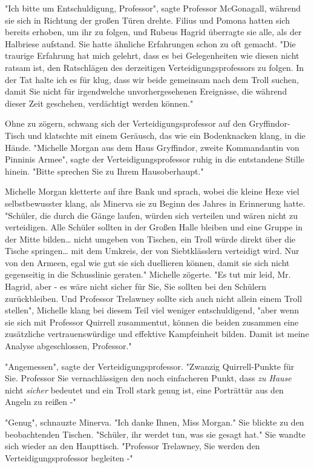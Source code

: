 {"Ich bitte um Entschuldigung, Professor", sagte Professor McGonagall, während sie sich in Richtung der großen Türen drehte. Filius und Pomona hatten sich bereits erhoben, um ihr zu folgen, und Rubeus Hagrid überragte sie alle, als der Halbriese aufstand. Sie hatte ähnliche Erfahrungen schon zu oft gemacht. "Die traurige Erfahrung hat mich gelehrt, dass es bei Gelegenheiten wie diesen nicht ratsam ist, den Ratschlägen des derzeitigen Verteidigungsprofessors zu folgen. In der Tat halte ich es für klug, dass wir beide gemeinsam nach dem Troll suchen, damit Sie nicht für irgendwelche unvorhergesehenen Ereignisse, die während dieser Zeit geschehen, verdächtigt werden können."

Ohne zu zögern, schwang sich der Verteidigungsprofessor auf den Gryffindor-Tisch und klatschte mit einem Geräusch, das wie ein Bodenknacken klang, in die Hände. "Michelle Morgan aus dem Haus Gryffindor, zweite Kommandantin von Pinninis Armee", sagte der Verteidigungsprofessor ruhig in die entstandene Stille hinein. "Bitte sprechen Sie zu Ihrem Hausoberhaupt."

Michelle Morgan kletterte auf ihre Bank und sprach, wobei die kleine Hexe viel selbstbewusster klang, als Minerva sie zu Beginn des Jahres in Erinnerung hatte. "Schüler, die durch die Gänge laufen, würden sich verteilen und wären nicht zu verteidigen. Alle Schüler sollten in der Großen Halle bleiben und eine Gruppe in der Mitte bilden… nicht umgeben von Tischen, ein Troll würde direkt über die Tische springen… mit dem Umkreis, der von Siebtklässlern verteidigt wird. Nur von den Armeen, egal wie gut sie sich duellieren können, damit sie sich nicht gegenseitig in die Schusslinie geraten." Michelle zögerte. "Es tut mir leid, Mr. Hagrid, aber - es wäre nicht sicher für Sie, Sie sollten bei den Schülern zurückbleiben. Und Professor Trelawney sollte sich auch nicht allein einem Troll stellen", Michelle klang bei diesem Teil viel weniger entschuldigend, "aber wenn sie sich mit Professor Quirrell zusammentut, können die beiden zusammen eine zusätzliche vertrauenswürdige und effektive Kampfeinheit bilden. Damit ist meine Analyse abgeschlossen, Professor."

"Angemessen", sagte der Verteidigungsprofessor. "Zwanzig Quirrell-Punkte für Sie. Professor Sie vernachlässigen den noch einfacheren Punkt, dass \emph{zu Hause} nicht \emph{sicher} bedeutet und ein Troll stark genug ist, eine Porträttür aus den Angeln zu reißen -"

"Genug", schnauzte Minerva. "Ich danke Ihnen, Miss Morgan." Sie blickte zu den beobachtenden Tischen. "Schüler, ihr werdet tun, was sie gesagt hat." Sie wandte sich wieder an den Haupttisch. "Professor Trelawney, Sie werden den Verteidigungsprofessor begleiten -"

}
